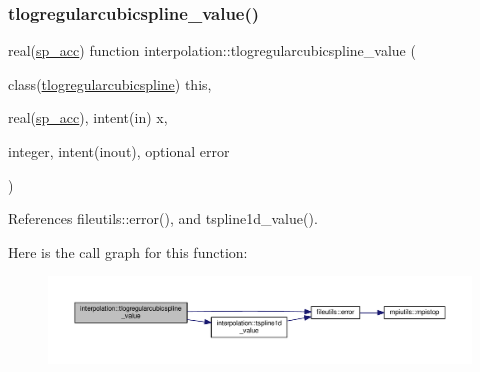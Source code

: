 \subsubsection{\texorpdfstring{tlogregularcubicspline\+\_\+value()}{tlogregularcubicspline\_value()}}
{\footnotesize\ttfamily real(\mbox{\hyperlink{namespaceinterpolation_af72aa9a05feb8ef90b2d26e4a013abf3}{sp\+\_\+acc}}) function interpolation\+::tlogregularcubicspline\+\_\+value (\begin{DoxyParamCaption}\item[{class(\mbox{\hyperlink{structinterpolation_1_1tlogregularcubicspline}{tlogregularcubicspline}})}]{this,  }\item[{real(\mbox{\hyperlink{namespaceinterpolation_af72aa9a05feb8ef90b2d26e4a013abf3}{sp\+\_\+acc}}), intent(in)}]{x,  }\item[{integer, intent(inout), optional}]{error }\end{DoxyParamCaption})}



References fileutils\+::error(), and tspline1d\+\_\+value().

Here is the call graph for this function\+:
\nopagebreak
\begin{figure}[H]
\begin{center}
\leavevmode
\includegraphics[width=350pt]{namespaceinterpolation_a7268d0f57d8b03233c2f2b56ac6fdc52_cgraph}
\end{center}
\end{figure}
\mbox{\label{namespaceinterpolation_a48194743476e43ec9aa03c02aab39655}} 
